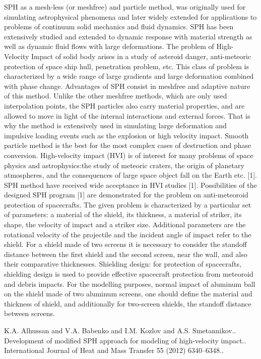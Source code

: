 \documentclass[article, A4, 11pt]{llncs}%
\begin{document}
SPH as a mesh-less (or meshfree) and particle method, was originally used for simulating astrophysical phenomena and later widely extended for applications to problems of continuum solid mechanics and fluid dynamics. SPH has been extensively studied and extended to dynamic response with material strength as well as dynamic fluid flows with large deformations. The problem of High-Velocity Impact of solid body arises in a study of asteroid danger, anti-meteoric protection of space ship hull, penetration problem, etc. This class of problem is characterized by a wide range of large gradients and large deformation combined with phase change.  Advantages of SPH consist in meshfree and adaptive nature of this method. Unlike the other meshfree methods, which are only used interpolation points, the SPH particles also carry material properties, and are allowed to move in light of the internal interactions and external forces. That is why the method is extensively used in simulating large deformation and impulsive loading events such as the explosion or high velocity impact. Smooth particle method is the best for the most complex cases of destruction and phase conversion. High-velocity impact (HVI) is of interest for many problems of space physics and astrophysics:the study of meteoric craters, the origin of planetary atmospheres, and the consequences of large space object fall on the Earth etc. [1]. SPH method have received wide acceptance in HVI studies [1]. Possibilities of the designed SPH program [1] are demonstrated for the problem on anti-meteoroid protection of spacecrafts. The given problem is characterized by a particular set of parameters: a material of the shield, its thickness, a material of striker, its shape, the velocity of impact and a striker size. Additional parameters are the rotational velocity of the projectile and the incident angle of impact refer to the shield. For a shield made of two screens it is necessary to consider the standoff distance between the first shield and the second screen, near the wall, and also their comparative thicknesses. Shielding design: for protection of spacecrafts, shielding design is used to provide effective spacecraft protection from meteoroid and debris impacts. For the modelling purposes, normal impact of aluminum ball on the shield made of two aluminum screens, one should define the material and thickness of shield, and additionally for two-screen shields, the standoff distance between screens.



\begin{thebibliography}{10}
{\sc K.A. Alhussan and V.A. Babenko and I.M. Kozlov and A.S. Smetannikov.}. {Development of modified SPH approach for modeling of high-velocity impact.}. International Journal of Heat and Mass Transfer 55 (2012) 6340–6348..
\end{thebibliography} %
\end{document}
